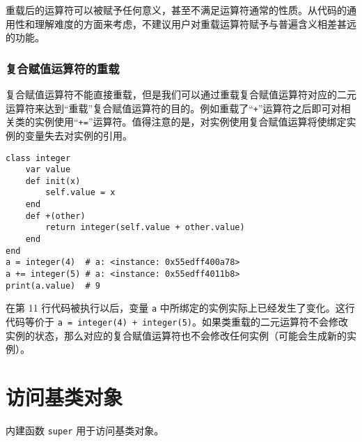 重载后的运算符可以被赋予任何意义，甚至不满足运算符通常的性质。从代码的通用性和理解难度的方面来考虑，不建议用户对重载运算符赋予与普遍含义相差甚远的功能。

\subsubsection{复合赋值运算符的重载}

复合赋值运算符不能直接重载，但是我们可以通过重载复合赋值运算符对应的二元运算符来达到“重载”复合赋值运算符的目的。例如重载了``\texttt{+}''运算符之后即可对相关类的实例使用``\texttt{+=}''运算符。值得注意的是，对实例使用复合赋值运算将使绑定实例的变量失去对实例的引用。
\begin{lstlisting}[language=berry]
class integer
    var value
    def init(x)
        self.value = x
    end
    def +(other)
        return integer(self.value + other.value)
    end
end
a = integer(4)  # a: <instance: 0x55edff400a78>
a += integer(5) # a: <instance: 0x55edff4011b8>
print(a.value)  # 9
\end{lstlisting}

在第 11 行代码被执行以后，变量 \texttt{a} 中所绑定的实例实际上已经发生了变化。这行代码等价于 \texttt{a = integer(4) + integer(5)}。如果类重载的二元运算符不会修改实例的状态，那么对应的复合赋值运算符也不会修改任何实例（可能会生成新的实例）。

\section{访问基类对象}

内建函数 \texttt{super} 用于访问基类对象。
